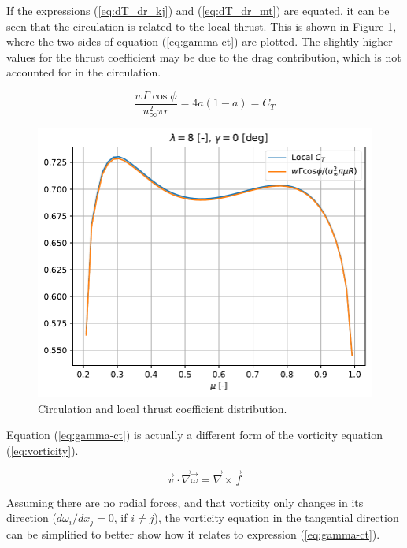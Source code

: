 If the expressions (\ref{eq:dT_dr_kj}) and (\ref{eq:dT_dr_mt}) are equated, it can be seen that the circulation is related to the local thrust. This is shown in Figure \ref{img:vort-forces}, where the two sides of equation (\ref{eq:gamma-ct}) are plotted. The slightly higher values for the thrust coefficient may be due to the drag contribution, which is not accounted for in the circulation.

\begin{equation}
	\frac{w \Gamma \cos \phi}{u_{\infty}^2 \pi r} = 4a(1-a) = C_T
	\label{eq:gamma-ct}
\end{equation}

\begin{figure}[htbp]
	\centering
	\includegraphics[height=0.45\textheight]{./img/circulation/vort-forces.pdf}
	\caption{Circulation and local thrust coefficient distribution.}
	\label{img:vort-forces}
\end{figure}

Equation (\ref{eq:gamma-ct}) is actually a different form of the vorticity equation (\ref{eq:vorticity}).

\begin{equation}
	\vec{v} \cdot \vec{\nabla} \vec{\omega} = \vec{\nabla} \times \vec{f}
	\label{eq:vorticity}
\end{equation}

Assuming there are no radial forces, and that vorticity only changes in its direction ($d\omega_i/dx_j = 0$, if $ i \neq j $), the vorticity equation in the tangential direction can be simplified to better show how it relates to expression (\ref{eq:gamma-ct}).

